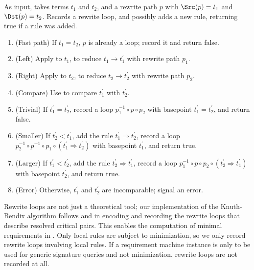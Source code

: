 \documentclass[../generics]{subfiles}
\begin{document}
\begin{algorithm}\label{add rule derived algo}
As input, takes terms $t_1$ and $t_2$, and a rewrite path $p$ with $\Src(p)=t_1$ and $\Dst(p)=t_2$. Records a rewrite loop, and possibly adds a new rule, returning true if a rule was added.
\begin{enumerate}
\item (Fast path) If $t_1=t_2$, $p$ is already a loop; record it and return false.
\item (Left) Apply  to $t_1$, to reduce $t_1\rightarrow t_1^\prime$ with rewrite path $p_1$.
\item (Right) Apply  to $t_2$, to reduce $t_2\rightarrow t_2^\prime$ with rewrite path $p_2$.
\item (Compare) Use  to compare $t_1^\prime$ with $t_2^\prime$.
\item (Trivial) If $t_1^\prime=t_2^\prime$, record a loop $p_1^{-1}\circ p\circ p_2$ with basepoint $t_1^\prime=t_2^\prime$, and return false.
\item (Smaller) If $t_2^\prime<t_1^\prime$, add the rule $t_1^\prime\Rightarrow t_2^\prime$, record a loop $p_2^{-1}\circ p^{-1}\circ p_1\circ (t_1^\prime\Rightarrow t_2^\prime)$ with basepoint $t_1^\prime$, and return true.
\item (Larger) If $t_1^\prime<t_2^\prime$, add the rule $t_2^\prime\Rightarrow t_1^\prime$, record a loop $p_1^{-1}\circ p \circ p_2 \circ (t_2^\prime\Rightarrow t_1^\prime)$ with basepoint $t_2^\prime$, and return true.
\item (Error) Otherwise, $t_1^\prime$ and $t_2^\prime$ are incomparable; signal an error.
\end{enumerate}
\end{algorithm}
Rewrite loops are not just a theoretical tool; our implementation of the Knuth-Bendix algorithm follows \cite{loggedrewriting} and \cite{homotopicalcompletion} in encoding and recording the rewrite loops that describe resolved critical pairs. This enables the computation of minimal requirements in . Only local rules are subject to minimization, so we only record rewrite loops involving local rules. If a requirement machine instance is only to be used for generic signature queries and not minimization, rewrite loops are not recorded at all.
\end{document}
